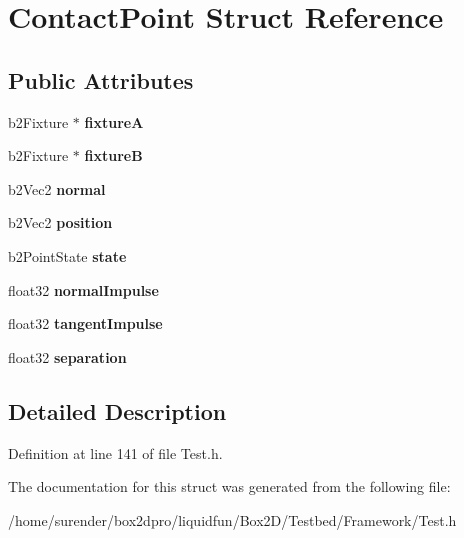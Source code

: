 \hypertarget{structContactPoint}{\section{Contact\-Point Struct Reference}
\label{structContactPoint}
}
\subsection*{Public Attributes}
\begin{DoxyCompactItemize}
\item 
\hypertarget{structContactPoint_ae0abe83cac1d16a0251c00eec2fdd9a8}{b2\-Fixture $\ast$ {\bfseries fixture\-A}}\label{structContactPoint_ae0abe83cac1d16a0251c00eec2fdd9a8}

\item 
\hypertarget{structContactPoint_a79157784afc39cf079438567b32e1612}{b2\-Fixture $\ast$ {\bfseries fixture\-B}}\label{structContactPoint_a79157784afc39cf079438567b32e1612}

\item 
\hypertarget{structContactPoint_a41bc30994cbefb7c33ed08fc5196a56e}{b2\-Vec2 {\bfseries normal}}\label{structContactPoint_a41bc30994cbefb7c33ed08fc5196a56e}

\item 
\hypertarget{structContactPoint_a4fb05c387ebf7e3d0a44c7655b5dd6b5}{b2\-Vec2 {\bfseries position}}\label{structContactPoint_a4fb05c387ebf7e3d0a44c7655b5dd6b5}

\item 
\hypertarget{structContactPoint_a1b95214f8bd0f1e8ceb4a990dd1b8cc4}{b2\-Point\-State {\bfseries state}}\label{structContactPoint_a1b95214f8bd0f1e8ceb4a990dd1b8cc4}

\item 
\hypertarget{structContactPoint_adffeee3b0c76d40d2cd397c1c0398e7a}{float32 {\bfseries normal\-Impulse}}\label{structContactPoint_adffeee3b0c76d40d2cd397c1c0398e7a}

\item 
\hypertarget{structContactPoint_a6af2d880cd0089f6ff0faeaa3437c4fa}{float32 {\bfseries tangent\-Impulse}}\label{structContactPoint_a6af2d880cd0089f6ff0faeaa3437c4fa}

\item 
\hypertarget{structContactPoint_ae462a579a9346ea2ba3d9729a45aefa7}{float32 {\bfseries separation}}\label{structContactPoint_ae462a579a9346ea2ba3d9729a45aefa7}

\end{DoxyCompactItemize}


\subsection{Detailed Description}


Definition at line 141 of file Test.\-h.



The documentation for this struct was generated from the following file\-:\begin{DoxyCompactItemize}
\item 
/home/surender/box2dpro/liquidfun/\-Box2\-D/\-Testbed/\-Framework/Test.\-h\end{DoxyCompactItemize}
